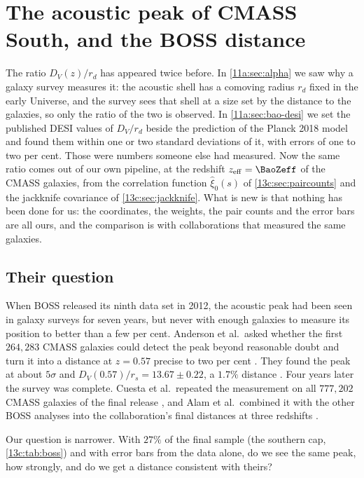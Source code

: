 \section{The acoustic peak of CMASS South, and the BOSS distance}
\label{13c:sec:reproduce}

The ratio $D_V(z)/r_d$ has appeared twice before. In \cref{11a:sec:alpha} we saw why a
galaxy survey measures it: the acoustic shell has a comoving radius $r_d$ fixed in the
early Universe, and the survey sees that shell at a size set by the distance to the
galaxies, so only the ratio of the two is observed. In \cref{11a:sec:bao-desi} we set
the published DESI values of $D_V/r_d$ beside the prediction of the Planck 2018 model
and found them within one or two standard deviations of it, with errors of one to two
per cent. Those were numbers someone else had measured. Now the same ratio comes out
of our own pipeline, at the redshift $z_{\rm eff}=\BaoZeff$ of the CMASS galaxies,
from the correlation function $\hat\xi_0(s)$ of \cref{13c:sec:paircounts} and the
jackknife covariance of \cref{13c:sec:jackknife}. What is new is that nothing has been
done for us: the coordinates, the weights, the pair counts and the error bars are all
ours, and the comparison is with collaborations that measured the same galaxies.

\subsection{Their question}
\label{13c:sec:repro-question}

When BOSS released its ninth data set in 2012, the acoustic peak had been seen in
galaxy surveys for seven years, but never with enough galaxies to measure its position
to better than a few per cent. Anderson et al.\ asked whether the first $264{,}283$
CMASS galaxies could detect the peak beyond reasonable doubt and turn it into a
distance at $z=0.57$ precise to two per cent \cite{Anderson2012}. They found the peak
at about $5\sigma$ and $D_V(0.57)/r_s=13.67\pm0.22$, a $1.7\%$ distance
. Four years later the survey was complete.
Cuesta et al.\ repeated the measurement on all $777{,}202$ CMASS galaxies of the final
release \cite{Cuesta2016}, and Alam et al.\ combined it with the other BOSS analyses
into the collaboration's final distances at three redshifts \cite{Alam2017}.

Our question is narrower. With $27\%$ of the final sample (the southern cap,
\cref{13c:tab:boss}) and with error bars from the data alone, do we see the same peak,
how strongly, and do we get a distance consistent with theirs?

